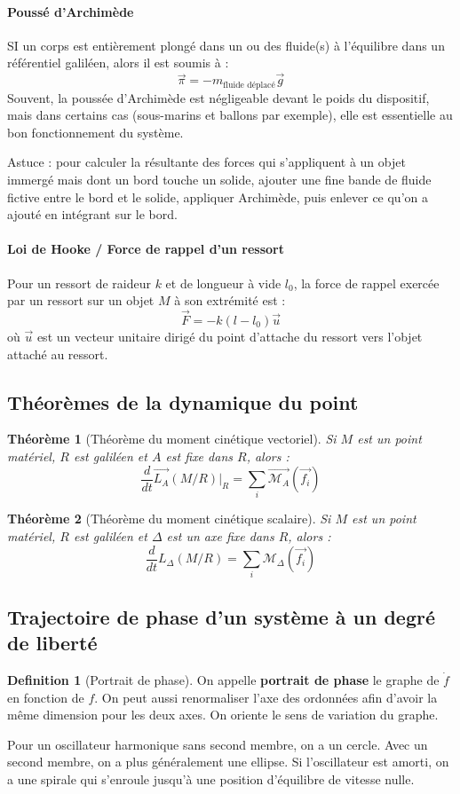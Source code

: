 \documentclass[french]{book}
\theoremstyle{plain}
\newtheorem{thm}{Théorème}
\theoremstyle{definition}
\newtheorem{dfn}{Definition}
\theoremstyle{remark}
\begin{document}
\paragraph{Poussé d'Archimède} SI un corps est entièrement plongé dans un ou des fluide(s) à l'équilibre dans un référentiel galiléen, alors il est soumis à : $$\overrightarrow{\pi}=-m_{\text{fluide déplacé}}\overrightarrow{g}$$ Souvent, la poussée d'Archimède est négligeable devant le poids du dispositif, mais dans certains cas (sous-marins et ballons par exemple), elle est essentielle au bon fonctionnement du système. \\ \par 
Astuce : pour calculer la résultante des forces qui s'appliquent à un objet immergé mais dont un bord touche un solide, ajouter une fine bande de fluide fictive entre le bord et le solide, appliquer Archimède, puis enlever ce qu'on a ajouté en intégrant sur le bord.
\paragraph{Loi de Hooke / Force de rappel d'un ressort} Pour un ressort de raideur $k$ et de longueur à vide $l_0$, la force de rappel exercée par un ressort sur un objet $M$ à son extrémité est : $$\overrightarrow{F}=-k(l-l_0)\overrightarrow{u}$$ où $\overrightarrow{u}$ est un vecteur unitaire dirigé du point d'attache du ressort vers l'objet attaché au ressort.

\subsection{Théorèmes de la dynamique du point}
\begin{thm}[Théorème du moment cinétique vectoriel]
	Si $M$ est un point matériel, $R$ est galiléen et $A$ est fixe dans $R$, alors : $$\frac{d}{dt}\overrightarrow{L_A}(M/R)\bigg\rvert_{R}=\sum_i\overrightarrow{\mathcal{M}_A}\left(\overrightarrow{f_i}\right)$$
\end{thm}
\begin{thm}[Théorème du moment cinétique scalaire]
	Si $M$ est un point matériel, $R$ est galiléen et $\Delta$ est un axe fixe dans $R$, alors : $$\frac{d}{dt}L_\Delta(M/R)=\sum_i\mathcal{M}_\Delta\left(\overrightarrow{f_i}\right)$$
\end{thm}
\subsection{Trajectoire de phase d'un système à un degré de liberté}
\begin{dfn}[Portrait de phase]
	On appelle \textbf{portrait de phase} le graphe de $\dot{f}$ en fonction de $f$. On peut aussi renormaliser l'axe des ordonnées afin d'avoir la même dimension pour les deux axes. On oriente le sens de variation du graphe.
\end{dfn}
Pour un oscillateur harmonique sans second membre, on a un cercle. Avec un second membre, on a plus généralement une ellipse. Si l'oscillateur est amorti, on a une spirale qui s'enroule jusqu'à une position d'équilibre de vitesse nulle.
\end{document}
